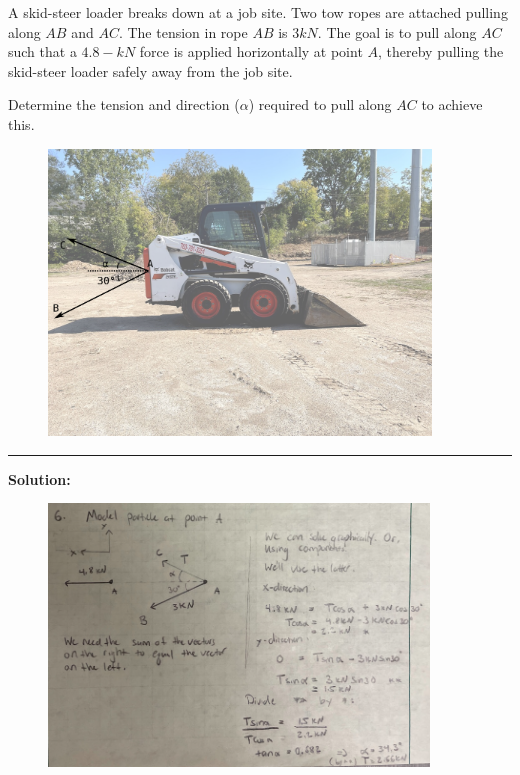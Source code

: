 
A skid-steer loader breaks down at a job site.  Two tow ropes are attached pulling along $AB$ and $AC$.  The tension in rope $AB$ is $3 kN$.  The goal is to pull along $AC$ such that a $4.8-kN$ force is applied horizontally at point $A$, thereby pulling the skid-steer loader safely away from the job site.

Determine the tension and direction ($\alpha$) required to pull along $AC$ to achieve this.

\begin{figure}[ht!]
  \centering
  \includegraphics[width=4.0in]{fig.png}
\end{figure}

\vspace{.5cm}
\rule{\textwidth}{.4pt}
\vspace{.5cm}
\textbf{Solution:}
\begin{figure}[ht!]
  \centering
  \includegraphics[width=0.9\textwidth,
	           height=0.4\textheight,
		   keepaspectratio]{soln.png}
\end{figure}


